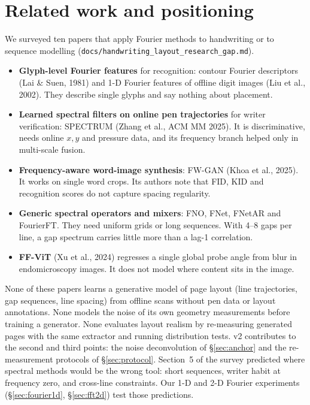 \documentclass[11pt,a4paper]{article}
\begin{document}
\section{Related work and positioning}
\label{sec:related}
We surveyed ten papers that apply Fourier methods to handwriting or to
sequence modelling (\texttt{docs/handwriting\_layout\_research\_gap.md}).
\begin{itemize}
\item \textbf{Glyph-level Fourier features} for recognition: contour Fourier
  descriptors (Lai \& Suen, 1981) and 1-D Fourier features of offline digit
  images (Liu et al., 2002). They describe single glyphs and say nothing about
  placement.
\item \textbf{Learned spectral filters on online pen trajectories} for writer
  verification: SPECTRUM (Zhang et al., ACM MM 2025). It is discriminative,
  needs online $x,y$ and pressure data, and its frequency branch helped only in
  multi-scale fusion.
\item \textbf{Frequency-aware word-image synthesis}: FW-GAN (Khoa et al.,
  2025). It works on single word crops. Its authors note that FID, KID and
  recognition scores do not capture spacing regularity.
\item \textbf{Generic spectral operators and mixers}: FNO, FNet, FNetAR and
  FourierFT. They need uniform grids or long sequences. With 4--8 gaps per
  line, a gap spectrum carries little more than a lag-1 correlation.
\item \textbf{FF-ViT} (Xu et al., 2024) regresses a single global probe angle
  from blur in endomicroscopy images. It does not model where content sits in
  the image.
\end{itemize}
None of these papers learns a generative model of page layout (line
trajectories, gap sequences, line spacing) from offline scans without pen data
or layout annotations. None models the noise of its own geometry measurements
before training a generator. None evaluates layout realism by re-measuring
generated pages with the same extractor and running distribution tests. v2
contributes to the second and third points: the noise deconvolution of
\S\ref{sec:anchor} and the re-measurement protocols of
\S\ref{sec:protocol}. Section~5 of the survey predicted where spectral methods
would be the wrong tool: short sequences, writer habit at frequency zero, and
cross-line constraints. Our 1-D and 2-D Fourier experiments
(\S\ref{sec:fourier1d}, \S\ref{sec:fft2d}) test those predictions.

\end{document}
